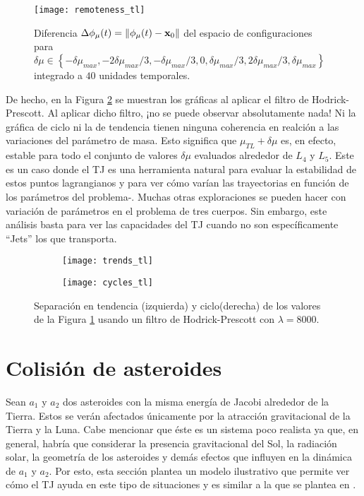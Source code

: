 \begin{figure}
 \centering
 \texttt{[image: remoteness\_tl]}
 \caption{Diferencia $\Delta\phi_\mu(t) = \left\lVert \phi_\mu(t) - \mathbf{x}_0 \right\rVert$ del espacio de configuraciones para $\delta\mu \in \left\lbrace -\delta\mu_{max}, -2\delta\mu_{max}/3, -\delta\mu_{max}/3, 0, \delta\mu_{max}/3, 2\delta\mu_{max}/3, \delta\mu_{max}  \right\rbrace$ integrado a $40$ unidades temporales.}
 \label{fig:remoteness_tl}
\end{figure}

De hecho, en la Figura \ref{fig:trendcycle_tl} se muestran los gráficas al aplicar el filtro de Hodrick-Prescott. Al aplicar dicho filtro, ¡no se puede observar absolutamente nada! Ni la gráfica de ciclo ni la de tendencia tienen ninguna coherencia en realción a las variaciones del parámetro de masa. Esto significa que $\mu_{TL} + \delta\mu$ es, en efecto, estable para todo el conjunto de valores $\delta\mu$ evaluados alrededor de $L_4$ y $L_5$. Este es un caso donde el TJ es una herramienta natural para evaluar la estabilidad de estos puntos lagrangianos y para ver cómo varían las trayectorias en función de los parámetros del problema-. Muchas otras exploraciones se pueden hacer con variación de parámetros en el problema de tres cuerpos. Sin embargo, este análisis basta para ver las capacidades del TJ cuando no son específicamente ``Jets'' los que transporta.

\begin{figure}[h!]
\centering
\begin{subfigure}{0.49\textwidth}
	\centering
	\texttt{[image: trends\_tl]}
\end{subfigure}
%
\begin{subfigure}{0.49\textwidth}
	\centering
	\texttt{[image: cycles\_tl]}
\end{subfigure}
\caption{ Separación en tendencia (izquierda) y ciclo(derecha) de los valores de la Figura \ref{fig:remoteness_tl} usando un filtro de Hodrick-Prescott con $\lambda = 8000$.}
\label{fig:trendcycle_tl}
\end{figure}

\pagebreak
\section{Colisión de asteroides}
\label{sec:asteroids}

Sean $a_1$ y $a_2$ dos asteroides con la misma energía de Jacobi alrededor de la Tierra. Estos se verán afectados únicamente por la atracción gravitacional de la Tierra y la Luna. Cabe mencionar que éste es un sistema poco realista ya que, en general, habría que considerar la presencia gravitacional del Sol, la radiación solar, la geometría de los asteroides y demás efectos que influyen en la dinámica de $a_1$ y $a_2$. Por esto, esta sección plantea un modelo ilustrativo que permite ver cómo el TJ  ayuda en este tipo de situaciones y es similar a la que se plantea en \cite{Perez2013}.

